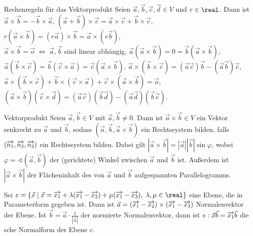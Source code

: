 \begin{Satz}{Rechenregeln für das Vektorprodukt}
    Seien $\vec{a}, \vec{b}, \vec{c}, \vec{d} \in V$ und $r \in \real$.
    Dann ist \\
    $\vec{a} \times \vec{b} = -\vec{b} \times \vec{a}$, \qquad
    $(\vec{a} + \vec{b}) \times \vec{c} =
    \vec{a} \times \vec{c} + \vec{b} \times \vec{c}$, \qquad
    $r(\vec{a} \times \vec{b}) = (r\vec{a}) \times \vec{b} =
    \vec{a} \times (r\vec{b})$, \\
    $\vec{a} \times \vec{b} = \vec{o} \;\Leftrightarrow\; \vec{a}, \vec{b}$
    sind linear abhängig, \qquad
    $\vec{a} (\vec{a} \times \vec{b}) = 0 =
    \vec{b} (\vec{a} \times \vec{b})$, \\
    $\vec{a} (\vec{b} \times \vec{c}) = \vec{b} (\vec{c} \times \vec{a}) =
    \vec{c} (\vec{a} \times \vec{b})$, \qquad
    $\vec{a} \times (\vec{b} \times \vec{c}) =
    (\vec{a} \vec{c}) \vec{b} - (\vec{a} \vec{b}) \vec{c}$, \\
    $\vec{a} \times (\vec{b} \times \vec{c}) +
    \vec{b} \times (\vec{c} \times \vec{a}) +
    \vec{c} \times (\vec{a} \times \vec{b}) = \vec{o}$, \qquad
    $(\vec{a} \times \vec{b})(\vec{c} \times \vec{d}) =
    (\vec{a} \vec{c}) (\vec{b} \vec{d}) - (\vec{a} \vec{d}) (\vec{b} \vec{c})$.
\end{Satz}

\begin{Satz}{Vektorprodukt}
    Seien $\vec{a}, \vec{b} \in V$ mit $\vec{a}, \vec{b} \not= 0$.
    Dann ist $\vec{a} \times \vec{b} \in V$ ein Vektor senkrecht zu $\vec{a}$
    und $\vec{b}$, sodass $(\vec{a}, \vec{b}, \vec{a} \times \vec{b})$ ein
    Rechtssystem bilden, falls $(\overrightarrow{n_1}, \overrightarrow{n_2}, \overrightarrow{n_3})$ ein
    Rechtssystem bilden.
    Dabei gilt $|\vec{a} \times \vec{b}| = |\vec{a}| |\vec{b}| \sin \varphi$,
    wobei $\varphi = \sphericalangle(\vec{a}, \vec{b})$ der (gerichtete) Winkel
    zwischen $\vec{a}$ und $\vec{b}$ ist.
    Außerdem ist $|\vec{a} \times \vec{b}|$ der Flächeninhalt des von
    $\vec{a}$ und $\vec{b}$ aufgespannten Parallelogramms.
\end{Satz}

\begin{Kor}
    Sei $e = \{\vec{x} \;|\; \vec{x} = \vektor{x_1} +
    \lambda (\vektor{x_1} - \vektor{x_2}) +
    \mu (\vektor{x_1} - \vektor{x_3}),\; \lambda, \mu \in \real\}$ eine Ebene,
    die in Parameterform gegeben ist.
    Dann ist $\vec{a} = (\overrightarrow{x_1} - \overrightarrow{x_2}) \times
    (\overrightarrow{x_1} - \overrightarrow{x_3})$
    Normalenvektor der Ebene.
    Ist $\vec{b} = \vec{a} \cdot \frac{1}{|\vec{a}|}$ der normierte
    Normalenvektor, dann ist
    $e: \vec{x} \vec{b} = \overrightarrow{x_1} \vec{b}$ die sche Normalform
    der Ebene $e$.
\end{Kor}

\pagebreak
